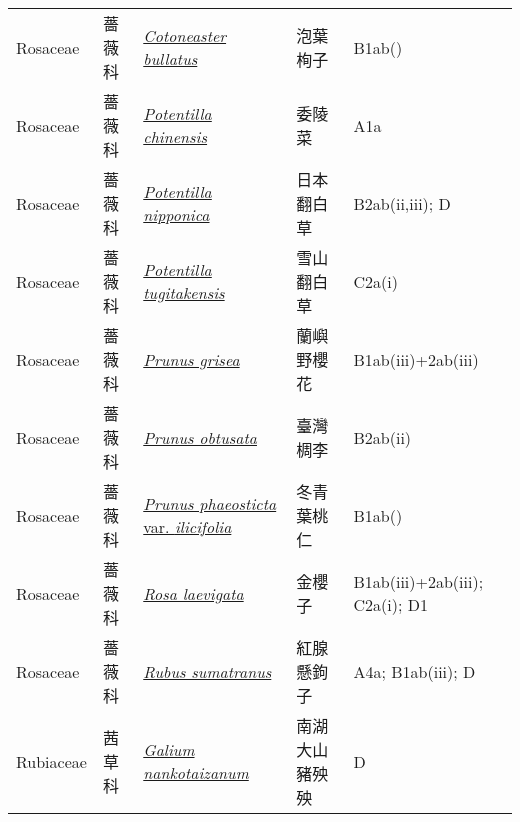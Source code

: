 {\begin{longtable}{p{2.5cm}p{2.5cm}p{4.5cm}p{2.5cm}p{3cm}}
    Rosaceae & 薔薇科 & \href{http://www.theplantlist.org/tpl1.1/search?q=Cotoneaster+bullatus}{\textit{Cotoneaster bullatus} } & 泡葉栒子 & B1ab() \index{Cotoneaster@\textit{Cotoneaster}!bullatus@\textit{bullatus}}  \index{泡葉栒子} \\
    Rosaceae & 薔薇科 & \href{http://www.theplantlist.org/tpl1.1/search?q=Potentilla+chinensis}{\textit{Potentilla chinensis} } & 委陵菜 & A1a \index{Potentilla@\textit{Potentilla}!chinensis@\textit{chinensis}}  \index{委陵菜} \\
    Rosaceae & 薔薇科 & \href{http://www.theplantlist.org/tpl1.1/search?q=Potentilla+nipponica}{\textit{Potentilla nipponica} } & 日本翻白草 & B2ab(ii,iii); D \index{Potentilla@\textit{Potentilla}!nipponica@\textit{nipponica}}  \index{日本翻白草} \\
    Rosaceae & 薔薇科 & \href{http://www.theplantlist.org/tpl1.1/search?q=Potentilla+tugitakensis}{\textit{Potentilla tugitakensis} } & 雪山翻白草 & C2a(i) \index{Potentilla@\textit{Potentilla}!tugitakensis@\textit{tugitakensis}}  \index{雪山翻白草} \\
    Rosaceae & 薔薇科 & \href{http://www.theplantlist.org/tpl1.1/search?q=Prunus+grisea}{\textit{Prunus grisea} } & 蘭嶼野櫻花 & B1ab(iii)+2ab(iii) \index{Prunus@\textit{Prunus}!grisea@\textit{grisea}}  \index{蘭嶼野櫻花} \\
    Rosaceae & 薔薇科 & \href{http://www.theplantlist.org/tpl1.1/search?q=Prunus+obtusata}{\textit{Prunus obtusata} } & 臺灣椆李 & B2ab(ii) \index{Prunus@\textit{Prunus}!obtusata@\textit{obtusata}}  \index{臺灣椆李} \\
    Rosaceae & 薔薇科 & \href{http://www.theplantlist.org/tpl1.1/search?q=Prunus+phaeosticta+var.+ilicifolia}{\textit{Prunus phaeosticta} var. \textit{ilicifolia} } & 冬青葉桃仁 & B1ab() \index{Prunus@\textit{Prunus}!phaeosticta@\textit{phaeosticta}!var. ilicifolia@var. \textit{ilicifolia}}  \index{冬青葉桃仁} \\
    Rosaceae & 薔薇科 & \href{http://www.theplantlist.org/tpl1.1/search?q=Rosa+laevigata}{\textit{Rosa laevigata} } & 金櫻子 & B1ab(iii)+2ab(iii); C2a(i); D1 \index{Rosa@\textit{Rosa}!laevigata@\textit{laevigata}}  \index{金櫻子} \\
    Rosaceae & 薔薇科 & \href{http://www.theplantlist.org/tpl1.1/search?q=Rubus+sumatranus}{\textit{Rubus sumatranus} } & 紅腺懸鉤子 & A4a; B1ab(iii); D \index{Rubus@\textit{Rubus}!sumatranus@\textit{sumatranus}}  \index{紅腺懸鉤子} \\
    Rubiaceae & 茜草科 & \href{http://www.theplantlist.org/tpl1.1/search?q=Galium+nankotaizanum}{\textit{Galium nankotaizanum} } & 南湖大山豬殃殃 & D \index{Galium@\textit{Galium}!nankotaizanum@\textit{nankotaizanum}}  \index{南湖大山豬殃殃} \\

\end{longtable}}
